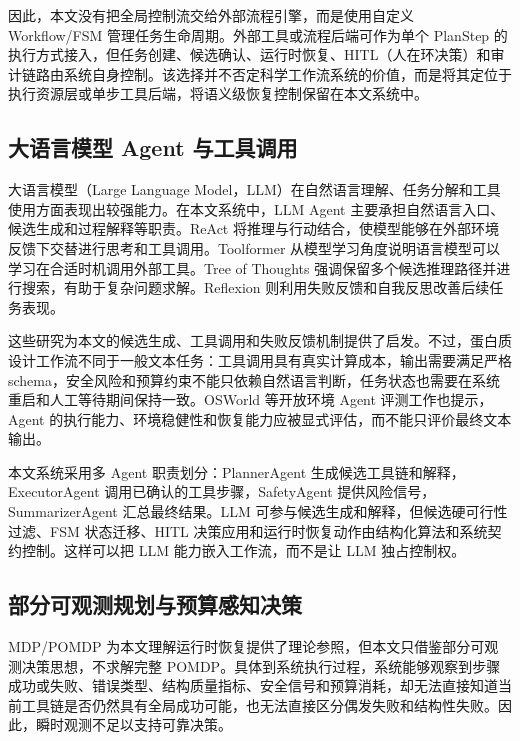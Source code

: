 因此，本文没有把全局控制流交给外部流程引擎，而是使用自定义 Workflow/FSM
管理任务生命周期。外部工具或流程后端可作为单个 PlanStep
的执行方式接入，但任务创建、候选确认、运行时恢复、HITL（人在环决策）和审计链路由系统自身控制。该选择并不否定科学工作流系统的价值，而是将其定位于执行资源层或单步工具后端，将语义级恢复控制保留在本文系统中。

\subsection{大语言模型 Agent
与工具调用}\label{ux5927ux8bedux8a00ux6a21ux578b-agent-ux4e0eux5de5ux5177ux8c03ux7528}

大语言模型（Large Language
Model，LLM）在自然语言理解、任务分解和工具使用方面表现出较强能力。在本文系统中，LLM
Agent 主要承担自然语言入口、候选生成和过程解释等职责。ReAct
将推理与行动结合，使模型能够在外部环境反馈下交替进行思考和工具调用\citep{yao2022react}。Toolformer
从模型学习角度说明语言模型可以学习在合适时机调用外部工具\citep{schick2023toolformer}。Tree
of Thoughts
强调保留多个候选推理路径并进行搜索，有助于复杂问题求解\citep{yao2023tot}。Reflexion
则利用失败反馈和自我反思改善后续任务表现\citep{shinn2023reflexion}。

这些研究为本文的候选生成、工具调用和失败反馈机制提供了启发。不过，蛋白质设计工作流不同于一般文本任务：工具调用具有真实计算成本，输出需要满足严格
schema，安全风险和预算约束不能只依赖自然语言判断，任务状态也需要在系统重启和人工等待期间保持一致。OSWorld
等开放环境 Agent 评测工作也提示，Agent
的执行能力、环境稳健性和恢复能力应被显式评估，而不能只评价最终文本输出\citep{xie2024osworld}。

本文系统采用多 Agent 职责划分：PlannerAgent
生成候选工具链和解释，ExecutorAgent 调用已确认的工具步骤，SafetyAgent
提供风险信号，SummarizerAgent 汇总最终结果。LLM
可参与候选生成和解释，但候选硬可行性过滤、FSM 状态迁移、HITL
决策应用和运行时恢复动作由结构化算法和系统契约控制。这样可以把 LLM
能力嵌入工作流，而不是让 LLM 独占控制权。

\subsection{部分可观测规划与预算感知决策}\label{ux90e8ux5206ux53efux89c2ux6d4bux89c4ux5212ux4e0eux9884ux7b97ux611fux77e5ux51b3ux7b56}

MDP/POMDP
为本文理解运行时恢复提供了理论参照，但本文只借鉴部分可观测决策思想，不求解完整
POMDP。具体到系统执行过程，系统能够观察到步骤成功或失败、错误类型、结构质量指标、安全信号和预算消耗，却无法直接知道当前工具链是否仍然具有全局成功可能，也无法直接区分偶发失败和结构性失败。因此，瞬时观测不足以支持可靠决策。

